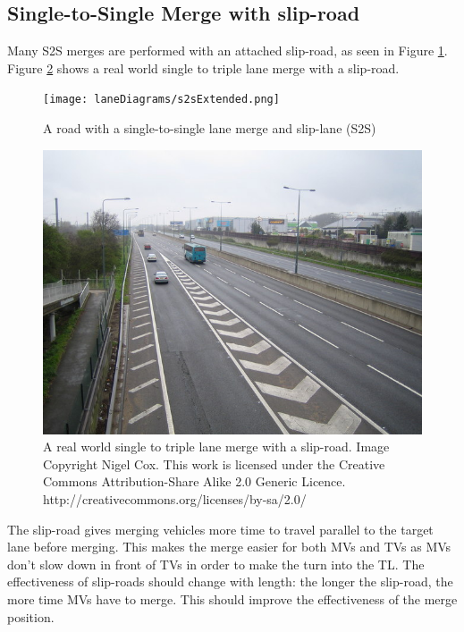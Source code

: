 \subsection{Single-to-Single Merge with slip-road}
\label{subsec:Single-to-Single Merge with slip-road}
Many S2S merges are performed with an attached slip-road, as seen in Figure \ref{fig:S2SMergeExtended}. Figure \ref{fig:realLaneMerge} shows a real world single to triple lane merge with a slip-road.

\begin{figure}[htb]{}
\texttt{[image: laneDiagrams/s2sExtended.png]}
\caption{A road with a single-to-single lane merge and slip-lane (S2S)}
\label{fig:S2SMergeExtended}
\end{figure}

\begin{figure}[htb]
\includegraphics[width=\textwidth]{images/laneDiagrams/realLaneMerge.jpg}
\caption{A real world single to triple lane merge with a slip-road. Image Copyright Nigel Cox. This work is licensed under the Creative Commons Attribution-Share Alike 2.0 Generic Licence. http://creativecommons.org/licenses/by-sa/2.0/ \citep{realLaneMerge}}
\label{fig:realLaneMerge}
\end{figure}

The slip-road gives merging vehicles more time to travel parallel to the target lane before merging. This makes the merge easier for both MVs and TVs as MVs don't slow down in front of TVs in order to make the turn into the TL. The effectiveness of slip-roads should change with length: the longer the slip-road, the more time MVs have to merge. This should improve the effectiveness of the merge position.

